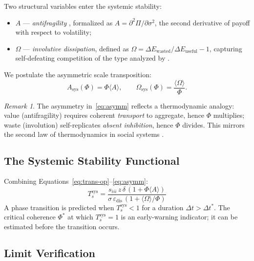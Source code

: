 \documentclass[12pt]{article}
\theoremstyle{plain}
\theoremstyle{definition}
\theoremstyle{remark}
\newtheorem{remark}{Remark}
\providecommand{\tightlist}{\setlength{\itemsep}{0pt}\setlength{\parskip}{0pt}}
\begin{document}
Two structural variables enter the systemic stability:
\begin{itemize}\tightlist
\item $A$ --- \emph{antifragility} \citep{taleb2012}, formalized as $A = \partial^2 \Pi / \partial \sigma^2$, the second derivative of payoff with respect to volatility;
\item $\Omega$ --- \emph{involutive dissipation}, defined as $\Omega = \Delta E_{\text{wasted}}/\Delta E_{\text{useful}} - 1$, capturing self-defeating competition of the type analyzed by \citet{xiang2020}.
\end{itemize}

We postulate the asymmetric scale transposition:
\begin{equation}\label{eq:asymm}
A_{\text{sys}}(\Phi) = \Phi \langle A \rangle, \qquad \Omega_{\text{sys}}(\Phi) = \frac{\langle \Omega \rangle}{\Phi}.
\end{equation}

\begin{remark}
The asymmetry in~\eqref{eq:asymm} reflects a thermodynamic analogy: value (antifragility) requires coherent \emph{transport} to aggregate, hence $\Phi$ multiplies; waste (involution) self-replicates \emph{absent inhibition}, hence $\Phi$ divides. This mirrors the second law of thermodynamics in social systems \citep{entropy2003}.
\end{remark}

\subsection{The Systemic Stability Functional}

Combining Equations~\eqref{eq:trans-op}--\eqref{eq:asymm}:
\begin{equation}\label{eq:ts-sys}
\boxed{T_s^{\text{sys}} = \frac{s_{iii} \, z \, \delta \, (1 + \Phi \langle A \rangle)}{\sigma \, \varepsilon_{\text{dis}} \, (1 + \langle \Omega \rangle / \Phi)}}
\end{equation}
A phase transition is predicted when $T_s^{\text{sys}} < 1$ for a duration $\Delta t > \Delta t^*$. The critical coherence $\Phi^*$ at which $T_s^{\text{sys}} = 1$ is an early-warning indicator; it can be estimated before the transition occurs.

\subsection{Limit Verification}
\end{document}
